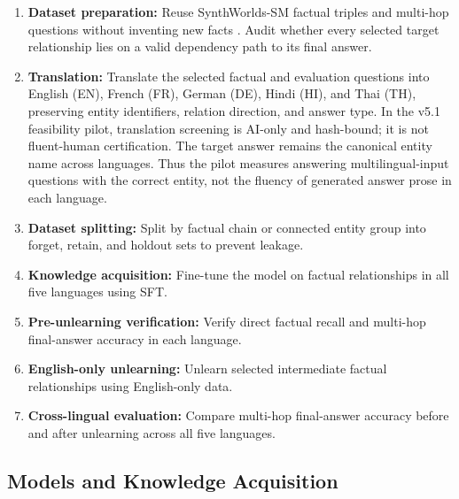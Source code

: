 \documentclass[10pt,a4paper]{article}
\begin{document}
\begin{enumerate}
    \item \textbf{Dataset preparation:}
    Reuse SynthWorlds-SM factual triples and multi-hop
    questions without inventing new facts \cite{gu2026synthworlds}.
    Audit whether every selected target relationship lies
    on a valid dependency path to its final answer.

    \item \textbf{Translation:}
    Translate the selected factual and evaluation questions into
    English (EN), French (FR), German (DE), Hindi (HI), and Thai (TH),
    preserving entity identifiers, relation direction, and answer type.
    In the v5.1 feasibility pilot, translation screening is AI-only and
    hash-bound; it is not fluent-human certification. The target answer
    remains the canonical entity name across languages. Thus the pilot
    measures answering multilingual-input questions with the correct
    entity, not the fluency of generated answer prose in each language.

    \item \textbf{Dataset splitting:}
    Split by factual chain or connected entity group into
    forget, retain, and holdout sets to prevent leakage.

    \item \textbf{Knowledge acquisition:}
    Fine-tune the model on factual relationships
    in all five languages using SFT.

    \item \textbf{Pre-unlearning verification:}
    Verify direct factual recall and multi-hop
    final-answer accuracy in each language.

    \item \textbf{English-only unlearning:}
    Unlearn selected intermediate factual relationships using English-only data.

    \item \textbf{Cross-lingual evaluation:}
    Compare multi-hop final-answer accuracy before and after unlearning across all five languages.
\end{enumerate}


\subsection{Models and Knowledge Acquisition}
\end{document}
